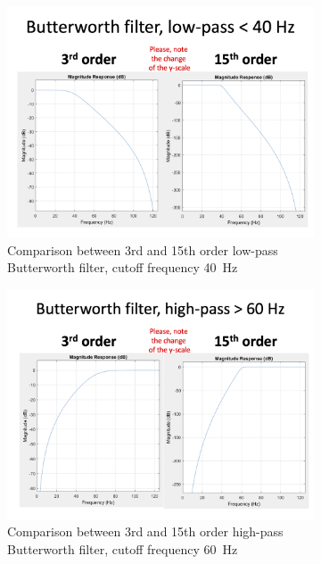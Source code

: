 \begin{figure}[!htpb]
\centering
\begin{subfigure}[b]{0.48\textwidth}
   \includegraphics[width=1\linewidth]{img/ch3/lp-butterworth-filter}
   \caption{Comparison between 3rd and 15th order low-pass Butterworth filter, cutoff frequency 40~Hz}
   \label{fig:lp-filters}
\end{subfigure}
\begin{subfigure}[b]{0.48\textwidth}
   \includegraphics[width=1\linewidth]{img/ch3/hp-butterworth-filter}
   \caption{Comparison between 3rd and 15th order high-pass Butterworth filter, cutoff frequency 60~Hz}
   \label{fig:hp-filters}
\end{subfigure}
\caption[Butterworth filters - order comparison]{}
\label{fig:filters}
\end{figure}

